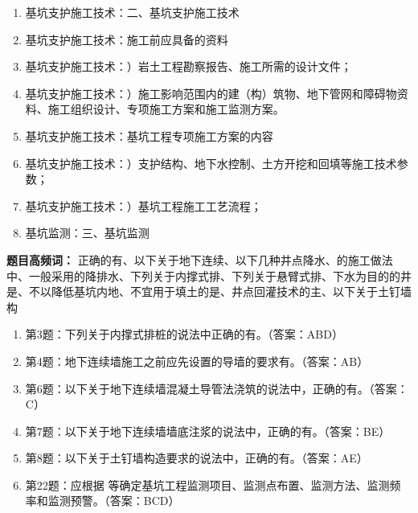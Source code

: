 \documentclass[UTF8,fontset=fandol,11pt]{ctexart}
\begin{document}
\begin{reviewbox}

\begin{enumerate}[label=\arabic*.]

\item 基坑支护施工技术：二、基坑支护施工技术

\item 基坑支护施工技术：施工前应具备的资料

\item 基坑支护施工技术：）岩土工程勘察报告、施工所需的设计文件；

\item 基坑支护施工技术：）施工影响范围内的建（构）筑物、地下管网和障碍物资料、施工组织设计、专项施工方案和施工监测方案。

\item 基坑支护施工技术：基坑工程专项施工方案的内容

\item 基坑支护施工技术：）支护结构、地下水控制、土方开挖和回填等施工技术参数；

\item 基坑支护施工技术：）基坑工程施工工艺流程；

\item 基坑监测：三、基坑监测

\end{enumerate}

\end{reviewbox}

\begin{mainbox}

\textbf{题目高频词：} 正确的有、以下关于地下连续、以下几种井点降水、的施工做法中、一般采用的降排水、下列关于内撑式排、下列关于悬臂式排、下水为目的的井是、不以降低基坑内地、不宜用于填土的是、井点回灌技术的主、以下关于土钉墙构

\end{mainbox}

\begin{enumerate}[label=\arabic*.]

\item 第3题：下列关于内撑式排桩的说法中正确的有。（答案：ABD）

\item 第4题：地下连续墙施工之前应先设置的导墙的要求有。（答案：AB）

\item 第6题：以下关于地下连续墙混凝土导管法浇筑的说法中，正确的有。（答案：C）

\item 第7题：以下关于地下连续墙墙底注浆的说法中，正确的有。（答案：BE）

\item 第8题：以下关于土钉墙构造要求的说法中，正确的有。（答案：AE）

\item 第22题：应根据 等确定基坑工程监测项目、监测点布置、监测方法、监测频率和监测预警。（答案：BCD）

\end{enumerate}
\end{document}
